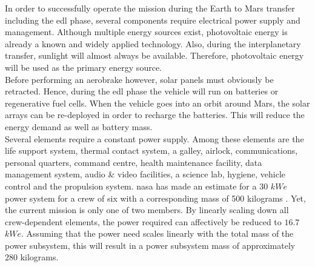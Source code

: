 In order to successfully operate the mission during the Earth to Mars transfer including the \gls{edl} phase, several components require electrical power supply and management. Although multiple  energy sources exist, photovoltaic energy is already a known and widely applied technology. Also, during the interplanetary transfer, sunlight will almost always be available. Therefore, photovoltaic energy will be used as the primary energy source.\\
 
Before performing an aerobrake however, solar panels must obviously be retracted. Hence, during the \gls{edl} phase the vehicle will run on batteries or regenerative fuel cells. When the vehicle goes into an orbit around Mars, the solar arrays can be re-deployed in order to recharge the batteries. This will reduce the energy demand as well as battery mass.\\

Several elements require a constant power supply. Among these elements are the life support system, thermal contact system, a galley, airlock, communications, personal quarters, command centre, health maintenance facility, data management system, audio \& video facilities, a science lab, hygiene, vehicle control and the propulsion system. \gls{nasa} has made an estimate for a $30$ $kWe$ power system for a crew of six with a corresponding mass of 500 kilograms \cite{Hoffman1997a}. Yet, the current mission is only one of two members. By linearly scaling down all crew-dependent elements, the power required can affectively be reduced to $16.7$ $kWe$. Assuming that the power need scales linearly with the total mass of the power subsystem, this will result in a power subsystem mass of approximately $280$ kilograms.\\